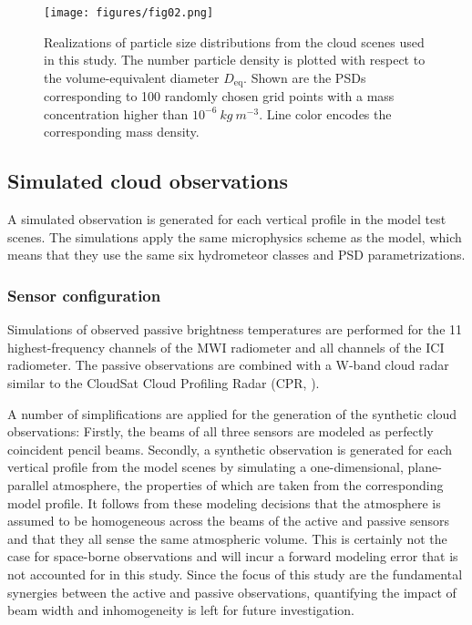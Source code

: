 \documentclass[journal abbreviation, manuscript]{copernicus}
\begin{document}
\begin{figure}[h!]
\centering \texttt{[image: figures/fig02.png]}
\caption{Realizations of particle size distributions from the cloud scenes used
  in this study. The number particle density is plotted with respect to the
  volume-equivalent diameter $D_\text{eq}$. Shown are the PSDs corresponding to
  100 randomly chosen grid points with a mass concentration higher than
  $10^{-6}\ \unit{kg\ m^{-3}}$. Line color encodes the corresponding mass density.}
\label{fig:gem_psds}
\end{figure}


\subsection{Simulated cloud observations}

A simulated observation is generated for each vertical profile in the
model test scenes. The simulations apply the same microphysics scheme
as the model, which means that they use the same six hydrometeor classes
and PSD parametrizations.

\subsubsection{Sensor configuration}
\label{sec:sensors}

Simulations of observed passive brightness temperatures are performed for the 11
highest-frequency channels of the MWI radiometer and all channels of the ICI
radiometer. The passive observations are combined with a W-band cloud radar
similar to the CloudSat Cloud Profiling Radar (CPR, \citet{stephens02,tanelli08}).

A number of simplifications are applied for the generation of the synthetic
cloud observations: Firstly, the beams of all three sensors are modeled as
perfectly coincident pencil beams. Secondly, a synthetic observation is
generated for each vertical profile from the model scenes by simulating a
one-dimensional, plane-parallel atmosphere, the properties of which are taken
from the corresponding model profile. It follows from these modeling decisions
that the atmosphere is assumed to be homogeneous across the beams of the active
and passive sensors and that they all sense the same atmospheric volume. This is
certainly not the case for space-borne observations and will incur a forward
modeling error that is not accounted for in this study. Since the focus of this
study are the fundamental synergies between the active and passive observations,
quantifying the impact of beam width and inhomogeneity is left for future
investigation.
\end{document}
